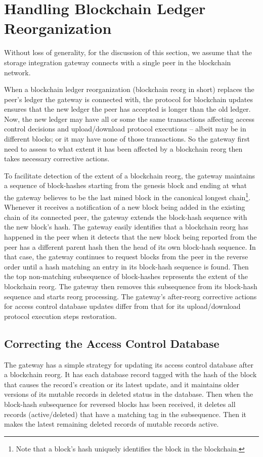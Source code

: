 \section{Handling Blockchain Ledger Reorganization}
\label{s-gate}
Without loss of generality, for the discussion of this section, we assume that the storage integration gateway connects with a single peer in the blockchain network.  

When a blockchain ledger reorganization (blockchain reorg in short) replaces the peer's ledger the gateway is connected with, the protocol for blockchain updates ensures that the new ledger the peer has accepted is longer than the old ledger. Now, the new ledger may have all or some the same transactions affecting access control decisions and upload/download protocol executions -- albeit may be in different blocks; or it may have none of those transactions. So the gateway first need to assess to what extent it has been affected by a blockchain reorg then takes necessary corrective actions.

To facilitate detection of the extent of a blockchain reorg, the gateway maintains a sequence of block-hashes starting from the genesis block and ending at what the gateway believes to be the last mined block in the canonical longest chain\footnote{Note that a block's hash uniquely identifies the block in the blockchain.}. Whenever it receives a notification of a new block being added in the existing chain of its connected peer, the gateway extends the block-hash sequence with the new block's hash. The gateway easily identifies that a blockchain reorg has happened in the peer when it detects that the new block being reported from the peer has a different parent hash then the head of its own block-hash sequence. In that case, the gateway continues to request blocks from the peer in the reverse order until a hash matching an entry in its block-hash sequence is found. Then the top non-matching subsequence of block-hashes represents the extent of the blockchain reorg. The gateway then removes this subsequence from its block-hash sequence and starts reorg processing. The gateway's after-reorg corrective actions for access control database updates differ from that for its upload/download protocol execution steps restoration.

\subsection{Correcting the Access Control Database}              
The gateway has a simple strategy for updating its access control database after a blockchain reorg. It has each database record tagged with the hash of the block that causes the record's creation or its latest update, and it maintains older versions of its mutable records in deleted status in the database. Then when the block-hash subsequence for reversed blocks has been received, it deletes all records (active/deleted) that have a matching tag in the subsequence. Then it makes the latest remaining deleted records of mutable records active. 

